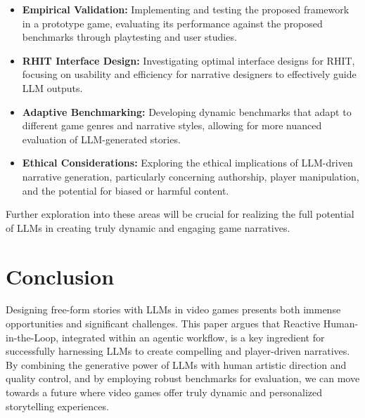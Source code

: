 \documentclass{article}
\begin{document}
\begin{itemize}
    \item \textbf{Empirical Validation:}  Implementing and testing the proposed framework in a prototype game, evaluating its performance against the proposed benchmarks through playtesting and user studies.
    \item \textbf{RHIT Interface Design:}  Investigating optimal interface designs for RHIT, focusing on usability and efficiency for narrative designers to effectively guide LLM outputs.
    \item \textbf{Adaptive Benchmarking:}  Developing dynamic benchmarks that adapt to different game genres and narrative styles, allowing for more nuanced evaluation of LLM-generated stories.
    \item \textbf{Ethical Considerations:}  Exploring the ethical implications of LLM-driven narrative generation, particularly concerning authorship, player manipulation, and the potential for biased or harmful content.
\end{itemize}

Further exploration into these areas will be crucial for realizing the full potential of LLMs in creating truly dynamic and engaging game narratives.

\section{Conclusion}

Designing free-form stories with LLMs in video games presents both immense opportunities and significant challenges.  This paper argues that Reactive Human-in-the-Loop, integrated within an agentic workflow, is a key ingredient for successfully harnessing LLMs to create compelling and player-driven narratives.  By combining the generative power of LLMs with human artistic direction and quality control, and by employing robust benchmarks for evaluation, we can move towards a future where video games offer truly dynamic and personalized storytelling experiences.
\end{document}

